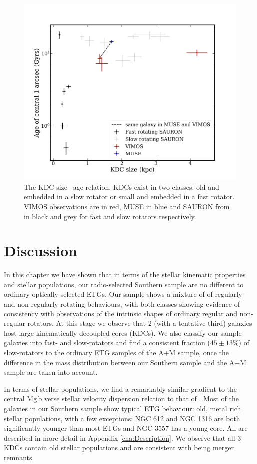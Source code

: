 		\begin{figure}
			\centering
			\includegraphics[width=.7\textwidth]{chapter4/KDC_size_age.png}
			\caption[KDC dichotomy]{The KDC size\,--\,age relation. KDCs exist in two classes: old and embedded in a slow rotator or small and embedded in a fast rotator. VIMOS observations are in red, MUSE in blue and SAURON from \citet{Kuntschner2010} in black and grey for fast and slow rotators respectively.}
			\label{fig:KDC}
		\end{figure}
	
\section{Discussion}
	\label{sec:stellarDiscussion}
	In this chapter we have shown that in terms of the stellar kinematic properties and stellar populations, our radio-selected Southern sample are no different to ordinary optically-selected ETGs. Our sample shows a mixture of of regularly- and non-regularly-rotating behaviours, with both classes showing evidence of consistency with observations of the intrinsic shapes of ordinary regular and non-regular rotators. At this stage we observe that 2 (with a tentative third) galaxies host large kinematically decoupled cores (KDCs). We also classify our sample galaxies into fast- and slow-rotators and find a consistent fraction ($45\pm13$\%) of slow-rotators to the ordinary ETG samples of the A+M sample, once the difference in the mass distribution between our Southern sample and the A+M sample are taken into account. 

	In terms of stellar populations, we find a remarkably similar gradient to the central Mg\,b verse stellar velocity dispersion relation to that of \citet{Ziegler1997}. Most of the galaxies in our Southern sample show typical ETG behaviour: old, metal rich stellar populations, with a few exceptions: NGC 612 and NGC 1316 are both significantly younger than most ETGs and NGC 3557 has a young core. All are described in more detail in Appendix \ref{cha:Description}. We observe that all 3 KDCs contain old stellar populations and are consistent with being merger remnants. 

